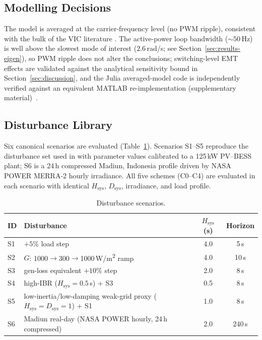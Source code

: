 \documentclass[journal]{IEEEtran}
\begin{document}
\subsection{Modelling Decisions}
The model is averaged at the carrier-frequency level (no PWM ripple),
consistent with the bulk of the VIC literature
\cite{liu2025cooperative,islam2024novel,liu2025frontiers,wang2024adaptive}.
The active-power loop bandwidth ($\sim 50\,$Hz) is well above the
slowest mode of interest ($2.6\,$rad/s; see
Section~\ref{sec:results-eigen}), so PWM ripple does not alter the
conclusions; switching-level EMT effects are validated against the
analytical sensitivity bound in Section~\ref{sec:discussion}, and the
Julia averaged-model code is independently verified against an
equivalent MATLAB re-implementation (supplementary
material)~\cite{johnson2024large}.

\subsection{Disturbance Library}
Six canonical scenarios are evaluated (Table~\ref{tab:scenarios}).
Scenarios S1--S5 reproduce the disturbance set used in
\cite{xu2020improved,liu2025cooperative,paturet2023fast} with
parameter values calibrated to a 125\,kW PV--BESS plant; S6 is a
24\,h compressed Madiun, Indonesia profile driven by NASA POWER
MERRA-2 hourly irradiance. All five schemes (C0--C4) are evaluated in
each scenario with identical $H_\mathrm{sys}$, $D_\mathrm{sys}$,
irradiance, and load profile.

\begin{table}[t]
\caption{Disturbance scenarios.}
\label{tab:scenarios}
\centering
\renewcommand{\arraystretch}{1.05}
\setlength{\tabcolsep}{4pt}
\footnotesize
\begin{tabular}{@{}lp{4.4cm}cc@{}}
\toprule
ID & Disturbance & $H_\mathrm{sys}$ (s) & Horizon \\
\midrule
S1 & $+5\%$ load step                                            & 4.0 & 5\,s \\
S2 & $G$: 1000$\to$300$\to$1000\,W/m\textsuperscript{2} ramp     & 4.0 & 10\,s \\
S3 & gen-loss equivalent $+10\%$ step                            & 2.0 & 8\,s \\
S4 & high-IBR ($H_\mathrm{sys}=0.5\,$s) + S3                     & 0.5 & 8\,s \\
S5 & low-inertia/low-damping weak-grid proxy ($H_\mathrm{sys}=D_\mathrm{sys}=1$) + S1 & 1.0 & 8\,s \\
S6 & Madiun real-day (NASA POWER hourly, 24\,h compressed)       & 2.0 & 240\,s \\
\bottomrule
\end{tabular}
\end{table}
\end{document}

